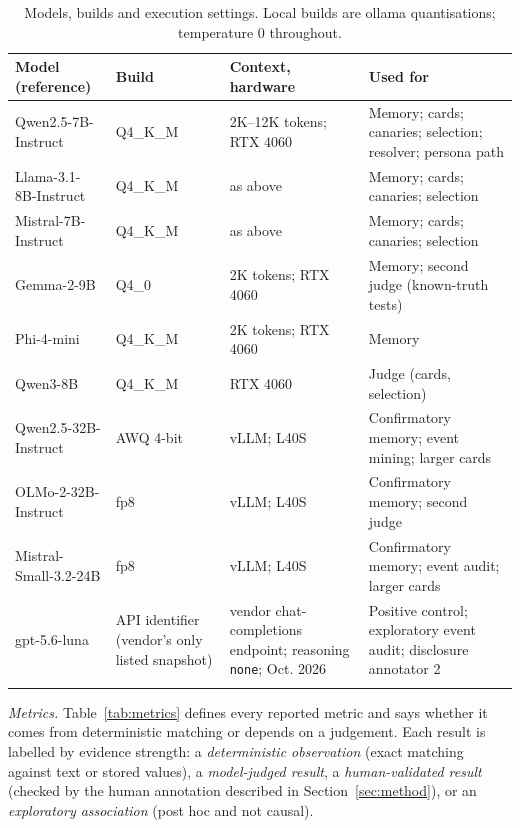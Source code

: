 \documentclass[sn-mathphys]{sn-jnl}%
\theoremstyle{thmstyleone}%
\theoremstyle{thmstyletwo}%
\theoremstyle{thmstylethree}%
\begin{document}
\begin{table}[!t]
\caption{Models, builds and execution settings. Local builds are ollama quantisations; temperature 0 throughout.}\label{tab:models}
\footnotesize
\begin{tabular*}{\textwidth}{@{\extracolsep\fill}p{3.3cm}p{1.5cm}p{2.6cm}p{3.9cm}}
\toprule
Model (reference) & Build & Context, hardware & Used for \\
\midrule
Qwen2.5-7B-Instruct \cite{qwen2025qwen25} & Q4\_K\_M & 2K--12K tokens; RTX 4060 & Memory; cards; canaries; selection; resolver; persona path \\
Llama-3.1-8B-Instruct \cite{grattafiori2024llama3} & Q4\_K\_M & as above & Memory; cards; canaries; selection \\
Mistral-7B-Instruct \cite{jiang2023mistral} & Q4\_K\_M & as above & Memory; cards; canaries; selection \\
Gemma-2-9B \cite{gemma2024gemma2} & Q4\_0 & 2K tokens; RTX 4060 & Memory; second judge (known-truth tests) \\
Phi-4-mini \cite{microsoft2025phi4mini} & Q4\_K\_M & 2K tokens; RTX 4060 & Memory \\
Qwen3-8B \cite{qwen2025qwen3} & Q4\_K\_M & RTX 4060 & Judge (cards, selection) \\
\midrule
Qwen2.5-32B-Instruct \cite{qwen2025qwen25} & AWQ 4-bit & vLLM; L40S & Confirmatory memory; event mining; larger cards \\
OLMo-2-32B-Instruct \cite{olmo2024olmo2} & fp8 & vLLM; L40S & Confirmatory memory; second judge \\
Mistral-Small-3.2-24B \cite{mistral2025small32} & fp8 & vLLM; L40S & Confirmatory memory; event audit; larger cards \\
\midrule
gpt-5.6-luna \cite{openai2026models} & API identifier (vendor's only listed snapshot) & vendor chat-completions endpoint; reasoning \texttt{none}; Oct. 2026 & Positive control; exploratory event audit; disclosure annotator 2 \\
\botrule
\end{tabular*}
\end{table}

\emph{Metrics.} Table~\ref{tab:metrics} defines every reported metric and says whether it comes from deterministic matching or depends on a judgement. Each result is labelled by evidence strength: a \emph{deterministic observation} (exact matching against text or stored values), a \emph{model-judged result}, a \emph{human-validated result} (checked by the human annotation described in Section~\ref{sec:method}), or an \emph{exploratory association} (post hoc and not causal).
\end{document}
